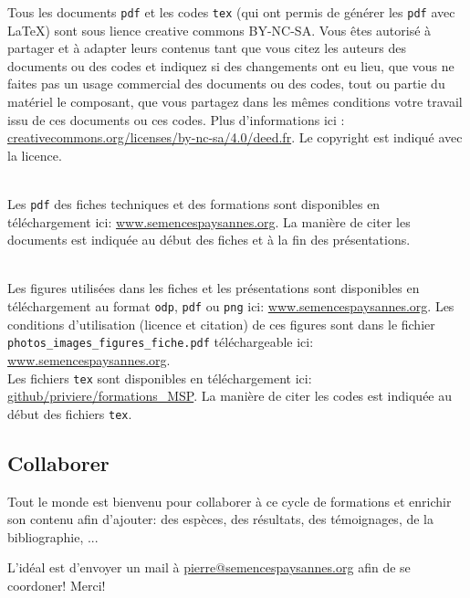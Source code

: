 Tous les documents \texttt{pdf} et les codes \texttt{tex} (qui ont permis de générer les \texttt{pdf} avec \LaTeX) sont sous lience creative commons BY-NC-SA. 
Vous êtes autorisé à partager et à adapter leurs contenus tant que vous citez les auteurs des documents ou des codes et indiquez si des changements ont eu lieu, que vous ne faites pas un usage commercial des documents ou des codes, tout ou partie du matériel le composant, que vous partagez dans les mêmes conditions votre travail issu de ces documents ou ces codes. 
Plus d'informations ici : \url{creativecommons.org/licenses/by-nc-sa/4.0/deed.fr}.
Le copyright est indiqué avec la licence.

~\\

Les \texttt{pdf} des fiches techniques et des formations sont disponibles en téléchargement ici: \url{www.semencespaysannes.org}.
La manière de citer les documents est indiquée au début des fiches et à la fin des présentations.

~\\

Les figures utilisées dans les fiches et les présentations sont disponibles en téléchargement au format \texttt{odp}, \texttt{pdf} ou \texttt{png} ici: \url{www.semencespaysannes.org}.
Les conditions d'utilisation (licence et citation) de ces figures sont dans le fichier \texttt{photos\_images\_figures\_fiche.pdf} téléchargeable ici:  \url{www.semencespaysannes.org}.
~\\

Les fichiers \texttt{tex} sont disponibles en téléchargement ici: \url{github/priviere/formations_MSP}.
La manière de citer les codes est indiquée au début des fichiers \texttt{tex}.

\section{Collaborer}
Tout le monde est bienvenu pour collaborer à ce cycle de formations et enrichir son contenu afin d'ajouter: 
des espèces,
des résultats,
des témoignages,
de la bibliographie, ...

L'idéal est d'envoyer un mail à \href{mailto:pierre@semencespaysannes.org}{\textcolor{mln-green} {pierre@semencespaysannes.org}} afin de se coordoner! Merci!

\chapter{\formationA}
\startcontents[chapters]

\newpage
{}
\newpage
 
% 
%
%
%
%
%
% 
%
% 
% 
% 

